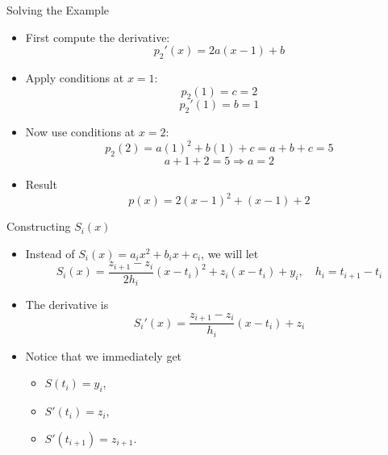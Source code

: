 \documentclass[10pt]{beamer}
\begin{document}
\begin{frame}{Solving the Example}

\begin{itemize}

\item First compute the derivative:
\[
p_2'(x) = 2a(x-1) + b
\]



\item Apply conditions at $x=1$:
\[
p_2(1)=c=2
\]
\[
p_2'(1)=b=1
\]

\item Now use conditions at $x=2$:
\[
p_2(2)=a(1)^2 + b(1) + c = a + b + c = 5
\]
\[
a + 1 + 2 = 5 \Rightarrow a = 2
\]
\item Result 
$$
    p(x)= 2(x-1)^2 +(x-1)+2
$$



\end{itemize}

\end{frame}
\begin{frame}{Constructing $S_i(x)$}

\begin{itemize}


\item Instead of $ S_i(x) = a_i x^2 + b_i x + c_i$, we will let 
    \[
S_i(x)
=
\frac{z_{i+1}-z_i}{2h_i}(x-t_i)^2
+ z_i(x-t_i) + y_i, \quad h_i = t_{i+1}-t_i
\]
\item The derivative is 
    \[
S_i'(x)
=
\frac{z_{i+1}-z_i}{h_i}(x-t_i)
+ z_i
\]
\item Notice that we immediately get 
\begin{itemize}
    \item $S(t_i)=y_i$,
    \item $S'(t_i)=z_i$,
    \item $S'(t_{i+1})=z_{i+1}$.
\end{itemize}
\end{itemize}
\end{frame}
\end{document}
